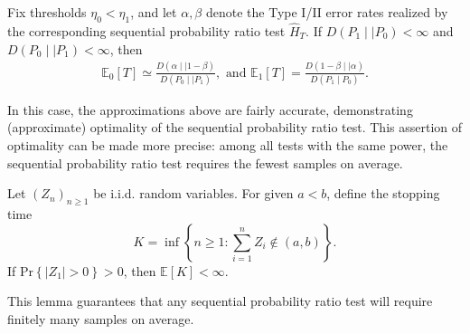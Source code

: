 \begin{thrm}{}{}
Fix thresholds \(\eta _0 < \eta _1\), and let \(\alpha , \beta \) denote the Type I/II error rates realized by the corresponding sequential probability ratio test \(\hat{H} _{T} \).  If \(D(P_1 \mid \mid P_0) < \infty \) and \(D(P_0 \mid \mid P_1) < \infty \), then 
\begin{align*}
    \mathbb{E}_0[T] \simeq \frac{D(\alpha \mid \mid 1 -\beta )}{D(P_0 \mid \mid P_1)} , \text{ and } \mathbb{E} _1[T] = \frac{D(1 -\beta \mid \mid \alpha )}{D(P_1 \mid P_0)} . 
\end{align*}

In this case, the approximations above are fairly accurate, demonstrating (approximate) optimality of the sequential probability ratio test. This assertion of optimality can be made more precise: among
all tests with the same power, the sequential probability ratio test requires
the fewest samples on average.

\end{thrm}


\begin{lem}{}{}
Let \((Z_{n} )_{n\geq 1} \) be i.i.d. random variables. For given \(a < b\), define the stopping time 
\[K = \inf \left\{ n \geq 1: \sum_{i = 1} ^n Z_{i} \notin (a,b) \right\} .\]
If \(\mathrm{Pr}\left\{ \left\lvert Z_1 \right\rvert  > 0 \right\} > 0  \), then \(\mathbb{E} [K] < \infty \).  

This lemma guarantees that any sequential probability ratio test will require finitely many samples on average.
\end{lem}